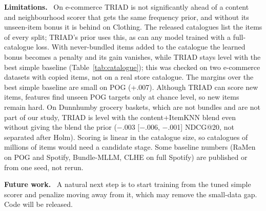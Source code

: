 \documentclass[runningheads]{llncs}
\renewcommand{\paragraph}[1]{\smallskip\noindent\textbf{#1}\ }
\begin{document}
\paragraph{Limitations.} On e-commerce TRIAD is not significantly ahead of a content and neighbourhood scorer that gets the
same frequency prior, and without its unseen-item bonus it is behind on Clothing. The released catalogues list the
items of every split; TRIAD's prior uses this, as can any model trained with a full-catalogue loss. With never-bundled
items added to the catalogue the learned bonus becomes a penalty and its gain vanishes, while TRIAD stays level with
the best simple baseline (Table~\ref{tab:catalogue}); this was checked on two e-commerce datasets with copied items,
not on a real store catalogue. The margins over the best simple baseline
are small on POG (+.007). Although TRIAD can score new items, features find unseen POG targets only at chance level,
so new items remain hard. On Dunnhumby grocery baskets, which are not bundles and are not part of our study, TRIAD is
level with the content+ItemKNN blend even without giving the blend the prior ($-$.003 [$-$.006, $-$.001] NDCG@20,
not separated after Holm). Scoring is linear in the catalogue size, so catalogues of millions of items would need a
candidate stage. Some baseline numbers (RaMen on POG and Spotify, Bundle-MLLM, CLHE on full Spotify) are published or
from one seed, not rerun.

\paragraph{Future work.} A natural next step is to start training from the tuned simple scorer and penalize moving
away from it, which may remove the small-data gap. Code will be released.
\end{document}
